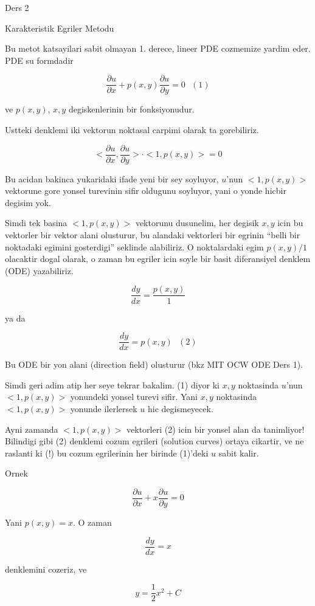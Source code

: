 \documentclass[12pt,fleqn]{article}\usepackage{../common}
\begin{document}
Ders 2

Karakteristik Egriler Metodu

Bu metot katsayilari sabit olmayan 1. derece, lineer PDE cozmemize yardim
eder. PDE su formdadir

\[ \frac{\partial u}{\partial x} + 
p(x,y) \frac{\partial u}{\partial y} = 0 
\ \ \ (1)
 \]

ve $p(x,y)$, $x,y$ degiskenlerinin bir fonksiyonudur. 

Ustteki denklemi iki vektorun noktasal carpimi olarak ta gorebiliriz. 

\[ 
<\frac{\partial u}{\partial x}, \frac{\partial u}{\partial y}> \cdot 
<1,p(x,y)> = 0
 \]

Bu acidan bakinca yukaridaki ifade yeni bir sey soyluyor, $u$'nun
$<1,p(x,y)>$ vektorune gore yonsel turevinin sifir oldugunu soyluyor, yani
o yonde hicbir degisim yok. 

Simdi tek basina $<1,p(x,y)>$ vektorunu dusunelim, her degisik $x,y$ icin
bu vektorler bir vektor alani olusturur, bu alandaki vektorleri bir egrinin
``belli bir noktadaki egimini gosterdigi'' seklinde alabiliriz. O
noktalardaki egim $p(x,y) / 1$ olacaktir dogal olarak, o zaman bu egriler
icin soyle bir basit diferansiyel denklem (ODE) yazabiliriz.

\[ \frac{dy}{dx} = \frac{p(x,y)}{1} \]

ya da

\[ \frac{dy}{dx} = p(x,y) 
\ \ \ (2)
\]

Bu ODE bir yon alani (direction field) olusturur (bkz MIT OCW ODE Ders 1).

Simdi geri adim atip her seye tekrar bakalim. (1) diyor ki $x,y$ noktasinda
$u$'nun $<1,p(x,y)>$ yonundeki yonsel turevi sifir. Yani $x,y$ noktasinda
$<1,p(x,y)>$ yonunde ilerlersek $u$ hic degismeyecek. 

Ayni zamanda $<1,p(x,y)>$ vektorleri (2) icin bir yonsel alan da
tanimliyor!  Bilindigi gibi (2) denklemi cozum egrileri (solution curves)
ortaya cikartir, ve ne raslanti ki (!) bu cozum egrilerinin her birinde
(1)'deki $u$ sabit kalir. 

Ornek 

\[ \frac{\partial u}{\partial x} + 
x \frac{\partial u}{\partial y} = 0 
 \]

Yani $p(x,y) = x$. O zaman 

\[ \frac{dy}{dx} = x \]

denklemini cozeriz, ve 

\[ y = \frac{1}{2}x^2 + C \]
\end{document}
